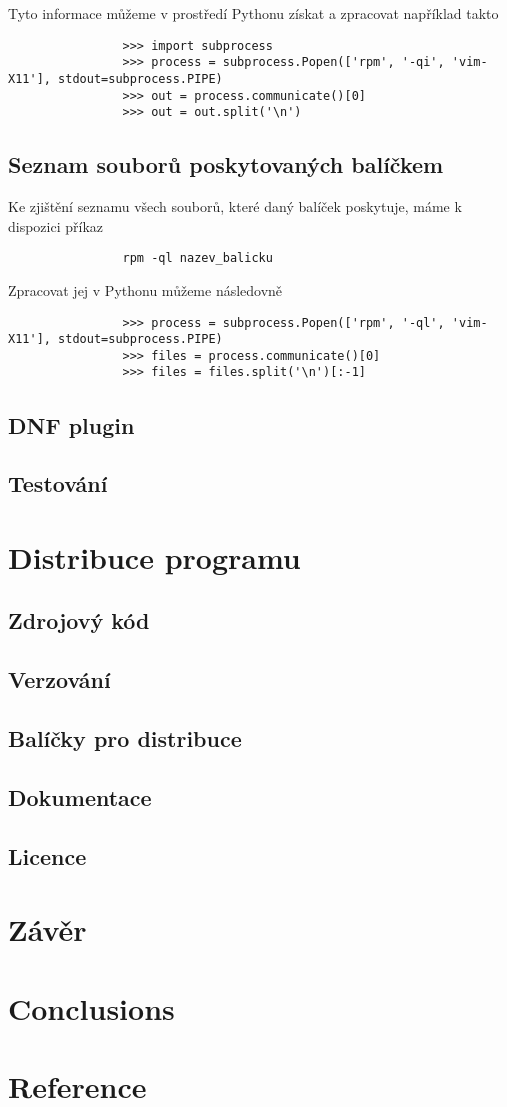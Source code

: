 \documentclass[10pt,a4paper]{article}
\begin{document}
			Tyto informace můžeme v prostředí Pythonu získat a zpracovat například takto
			\begin{verbatim}
				>>> import subprocess
				>>> process = subprocess.Popen(['rpm', '-qi', 'vim-X11'], stdout=subprocess.PIPE)
				>>> out = process.communicate()[0]
				>>> out = out.split('\n')
			\end{verbatim}

			\subsection{Seznam souborů poskytovaných balíčkem}
			Ke zjištění seznamu všech souborů, které daný balíček poskytuje, máme k dispozici příkaz

			\begin{verbatim}
				rpm -ql nazev_balicku
			\end{verbatim}

			Zpracovat jej v Pythonu můžeme následovně

			\begin{verbatim}
				>>> process = subprocess.Popen(['rpm', '-ql', 'vim-X11'], stdout=subprocess.PIPE)
				>>> files = process.communicate()[0]
				>>> files = files.split('\n')[:-1]
			\end{verbatim}

		\subsection{DNF plugin}
		\subsection{Testování}

	\section{Distribuce programu}
		\subsection{Zdrojový kód}
		\subsection{Verzování}
		\subsection{Balíčky pro distribuce}
		\subsection{Dokumentace}
		\subsection{Licence}

	\section{Závěr} %
	\section{Conclusions} %
	\section{Reference} %

\end{document}
